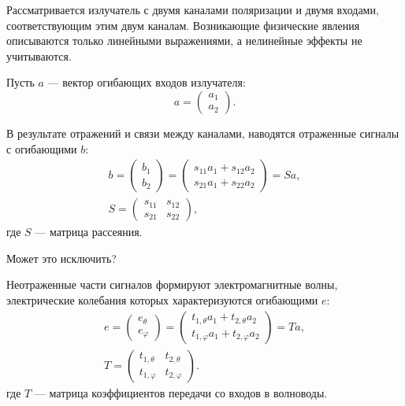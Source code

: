 Рассматривается излучатель с двумя каналами поляризации и двумя входами, соответствующим этим двум каналам. Возникающие физические явления описываются только
линейными выражениями, а нелинейные эффекты не учитываются.

Пусть $a$ --- вектор огибающих входов излучателя:
\[
    a
    = \begin{pmatrix}
          a_1 \\
          a_2
    \end{pmatrix} .
\]

В результате отражений и связи между каналами, наводятся отраженные сигналы с огибающими $b$:
\begin{gather*}
    b
    = \begin{pmatrix}
          b_1 \\
          b_2
    \end{pmatrix}
    = \begin{pmatrix}
          s_{11} a_1 + s_{12} a_2 \\
          s_{21} a_1 + s_{22} a_2
    \end{pmatrix}
    = S a, \\
    S
    = \begin{pmatrix}
          s_{11} & s_{12} \\
          s_{21} & s_{22}
    \end{pmatrix},
\end{gather*}
где $S$ --- матрица рассеяния.

    {
    \color{red}
    Может это исключить?

    Неотраженные части сигналов формируют электромагнитные волны, электрические колебания которых характеризуются огибающими $e$:
    \begin{gather*}
        e
        = \begin{pmatrix}
              e_\theta \\
              e_\varphi
        \end{pmatrix}
        = \begin{pmatrix}
              t_{1, \theta} a_1 + t_{2, \theta} a_2 \\
              t_{1, \varphi} a_1 + t_{2, \varphi} a_2
        \end{pmatrix}
        = T a, \\
        T
        = \begin{pmatrix}
              t_{1, \theta}  & t_{2, \theta}  \\
              t_{1, \varphi} & t_{2, \varphi}
        \end{pmatrix} .
    \end{gather*}
    где $T$ --- матрица коэффициентов передачи со входов в волноводы.
}

